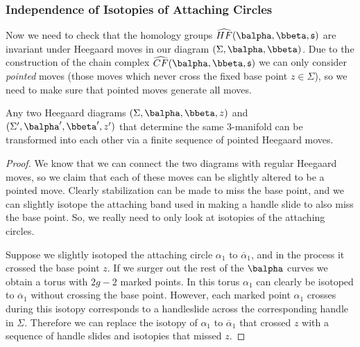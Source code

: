 \subsubsection{Independence of Isotopies of Attaching Circles}


Now we need to check that the homology groups $\widehat{HF}(\balpha,\bbeta,\mathfrak s)$ are invariant under Heegaard moves in our diagram $(\Sigma,\balpha,\bbeta)$. Due to the construction of the chain complex $\widehat{CF}(\balpha,\bbeta,\mathfrak s)$ we can only consider \emph{pointed} moves (those moves which never cross the fixed base point $z \in \Sigma$), so we need to make sure that pointed moves generate all moves.
\begin{prop}
Any two Heegaard diagrams $(\Sigma,\balpha,\bbeta,z)$ and $(\Sigma',\balpha',\bbeta',z')$ that determine the same 3-manifold can be transformed into each other via a finite sequence of pointed Heegaard moves.
\end{prop}
\begin{proof}
We know that we can connect the two diagrams with regular Heegaard moves, so we claim that each of these moves can be slightly altered to be a pointed move. Clearly stabilization can be made to miss the base point, and we can slightly isotope the attaching band used in making a handle slide to also miss the base point. So, we really need to only look at isotopies of the attaching circles.

Suppose we slightly isotoped the attaching circle $\alpha_1$ to $\overline{\alpha}_1$, and in the process it crossed the base point $z$. If we surger out the rest of the $\balpha$ curves we obtain a torus with $2g-2$ marked points. In this torus $\alpha_1$ can clearly be isotoped to $\overline{\alpha}_1$ without crossing the base point. However, each marked point $\alpha_1$ crosses during this isotopy corresponds to a handleslide across the corresponding handle in $\Sigma$. Therefore we can replace the isotopy of $\alpha_1$ to $\overline{\alpha}_1$ that crossed $z$ with a sequence of handle slides and isotopies that missed $z$.
\end{proof}

